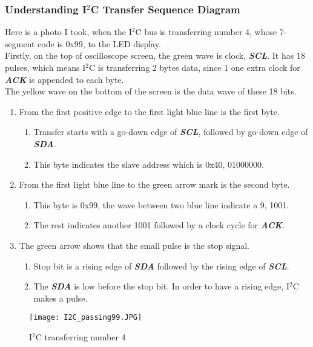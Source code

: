 \documentclass[11pt,fleqn]{article}
\begin{document}
\subsubsection{Understanding I$^{2}$C Transfer Sequence Diagram}
Here is a photo I took, when the I$^{2}$C bus is transferring number 4, whose 7-segment code is 0x99, to the LED display.\\
Firstly, on the top of oscilloscope screen, the green wave is clock, \textbf{\emph{SCL}}. It has 18 pulses, which means I$^{2}$C is transferring 2 bytes data, since 1 one extra clock for \textbf{\emph{ACK}} is appended to each byte. \\
The yellow wave on the bottom of the screen is the data wave of these 18 bits. 
\begin{enumerate}
  \item From the first positive edge to the first light blue line is the first byte.
    \begin{enumerate}
      \item Transfer starts with a go-down edge of \textbf{\emph{SCL}}, followed by go-down edge of \textbf{\emph{SDA}}.
      \item This byte indicates the slave address which is 0x40, 01000000.
    \end{enumerate}
  \item From the first light blue line to the green arrow mark is the second byte.
    \begin{enumerate}
      \item This byte is 0x99, the wave between two blue line indicate a 9, 1001.
      \item The rest indicates another 1001 followed by a clock cycle for \textbf{\emph{ACK}}.
    \end{enumerate}
  \item The green arrow shows that the small pulse is the stop signal.
    \begin{enumerate}
      \item Stop bit is a rising edge of \textbf{\emph{SDA}} followed by the rising edge of \textbf{\emph{SCL}}.
      \item The \textbf{\emph{SDA}} is low before the stop bit. In order to have a rising edge,  I$^{2}$C makes a pulse.
    \end{enumerate}
\end{enumerate}
\begin{figure}[H]
\centering
\texttt{[image: I2C\_passing99.JPG]}
\caption{I$^{2}$C transferring number 4}
\end{figure}
\end{document}
